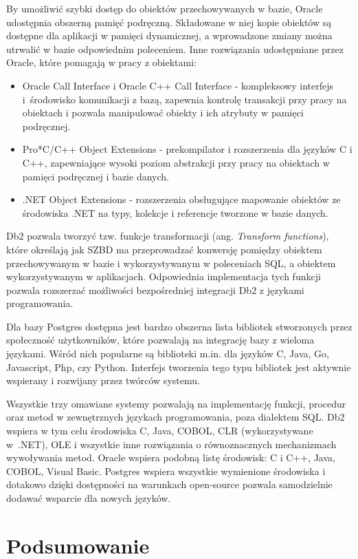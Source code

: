 \documentclass[a4paper,twoside,12pt]{book}
\begin{document}
By umożliwić szybki dostęp do obiektów przechowywanych w bazie, Oracle udostępnia obszerną pamięć podręczną. Składowane w niej kopie obiektów są dostępne dla aplikacji w pamięci dynamicznej, a wprowadzone zmiany można utrwalić w bazie odpowiednim poleceniem. Inne rozwiązania udostępniane przez Oracle, które pomagają w pracy z obiektami:
\begin{itemize}
\item Oracle Call Interface i Oracle C++ Call Interface - kompleksowy interfejs i~środowisko komunikacji z bazą, zapewnia kontrolę transakcji przy pracy na obiektach i pozwala manipulować obiekty i ich atrybuty w pamięci podręcznej. 
\item Pro*C/C++ Object Extensions - prekompilator i rozszerzenia dla języków C i C++, zapewniające wysoki poziom abstrakcji przy pracy na obiektach w pamięci podręcznej i bazie danych.
\item .NET Object Extensions - rozszerzenia obsługujące mapowanie obiektów ze środowiska .NET na typy, kolekcje i referencje tworzone w bazie danych.
\end{itemize}

Db2 pozwala tworzyć tzw. funkcje transformacji (ang. \textit{Transform functions}), które określają jak SZBD ma przeprowadzać konwersję pomiędzy obiektem przechowywanym w bazie i wykorzystywanym w poleceniach SQL, a obiektem wykorzystywanym w aplikacjach. Odpowiednia implementacja tych funkcji pozwala rozszerzać możliwości bezpośredniej integracji Db2 z językami programowania.

Dla bazy Postgres dostępna jest bardzo obszerna lista bibliotek stworzonych przez społeczność użytkowników, które pozwalają na integrację bazy z wieloma językami. Wśród nich popularne są biblioteki m.in. dla języków C, Java, Go, Javascript, Php, czy Python. Interfejs tworzenia tego typu bibliotek jest aktywnie wspierany i rozwijany przez twórców systemu. 

Wszystkie trzy omawiane systemy pozwalają na implementację funkcji, procedur oraz metod w zewnętrznych językach programowania, poza dialektem SQL. Db2 wspiera w tym celu środowiska C, Java, COBOL, CLR (wykorzystywane w~.NET), OLE i wszystkie inne rozwiązania o równoznacznych mechanizmach wywoływania metod. Oracle wspiera podobną listę środowisk: C i C++, Java, COBOL, Visual Basic. Postgres wspiera wszystkie wymienione środowiska i dotakowo dzięki dostępności na warunkach open-source pozwala samodzielnie dodawać wsparcie dla nowych języków.
 
\section{Podsumowanie}
\end{document}
